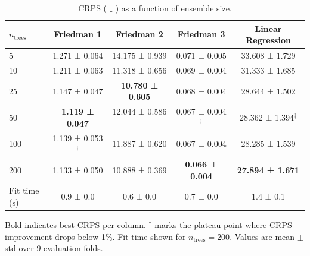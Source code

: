\begin{table}[htbp]
\centering
\caption{CRPS ($\downarrow$) as a function of ensemble size.}
\label{tab:n-trees-crps}
\begin{tabular}{lcccc}
\toprule
$n_{\text{trees}}$ & Friedman 1 & Friedman 2 & Friedman 3 & Linear Regression \\
\midrule
5 & 1.271 ± 0.064 & 14.175 ± 0.939 & 0.071 ± 0.005 & 33.608 ± 1.729 \\
10 & 1.211 ± 0.063 & 11.318 ± 0.656 & 0.069 ± 0.004 & 31.333 ± 1.685 \\
25 & 1.147 ± 0.047 & \textbf{10.780 ± 0.605} & 0.068 ± 0.004 & 28.644 ± 1.502 \\
50 & \textbf{1.119 ± 0.047} & 12.044 ± 0.586$^{\dagger}$ & 0.067 ± 0.004$^{\dagger}$ & 28.362 ± 1.394$^{\dagger}$ \\
100 & 1.139 ± 0.053$^{\dagger}$ & 11.887 ± 0.620 & 0.067 ± 0.004 & 28.285 ± 1.539 \\
200 & 1.133 ± 0.050 & 10.888 ± 0.369 & \textbf{0.066 ± 0.004} & \textbf{27.894 ± 1.671} \\
\midrule
Fit time (s) & 0.9 ± 0.0 & 0.6 ± 0.0 & 0.7 ± 0.0 & 1.4 ± 0.1 \\
\bottomrule
\end{tabular}
\par\smallskip\footnotesize{Bold indicates best CRPS per column. $^{\dagger}$ marks the plateau point where CRPS improvement drops below 1\%. Fit time shown for $n_{\text{trees}}=200$. Values are mean $\pm$ std over 9 evaluation folds.}
\end{table}
